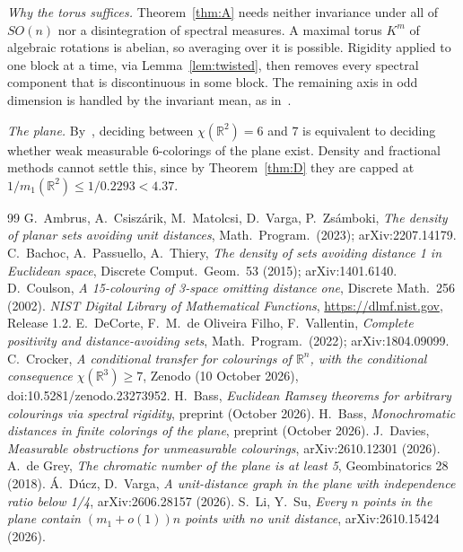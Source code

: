 \documentclass[11pt]{amsart}
\theoremstyle{definition}
\newcommand{\R}{\mathbb{R}}
\begin{document}
\emph{Why the torus suffices.} Theorem~\ref{thm:A} needs neither invariance under all of $SO(n)$ nor a disintegration of spectral measures. A maximal torus $K^m$ of algebraic rotations is abelian, so averaging over it is possible. Rigidity applied to one block at a time, via Lemma~\ref{lem:twisted}, then removes every spectral component that is discontinuous in some block. The remaining axis in odd dimension is handled by the invariant mean, as in~\cite[Lemma 2.5]{OAI}.

\emph{The plane.} By~\cite[Theorem 1.3]{OAI}, deciding between $\chi(\R^2)=6$ and $7$ is equivalent to deciding whether weak measurable $6$-colorings of the plane exist. Density and fractional methods cannot settle this, since by Theorem~\ref{thm:D} they are capped at $1/m_1(\R^2)\le 1/0.2293<4.37$.

\begin{thebibliography}{99}
 G.~Ambrus, A.~Csisz\'arik, M.~Matolcsi, D.~Varga, P.~Zs\'amboki, \emph{The density of planar sets avoiding unit distances}, Math.\ Program.\ (2023); arXiv:2207.14179.
 C.~Bachoc, A.~Passuello, A.~Thiery, \emph{The density of sets avoiding distance 1 in Euclidean space}, Discrete Comput.\ Geom.\ 53 (2015); arXiv:1401.6140.
 D.~Coulson, \emph{A 15-colouring of 3-space omitting distance one}, Discrete Math.\ 256 (2002).
 \emph{NIST Digital Library of Mathematical Functions}, \url{https://dlmf.nist.gov}, Release 1.2.
 E.~DeCorte, F.~M.~de Oliveira Filho, F.~Vallentin, \emph{Complete positivity and distance-avoiding sets}, Math.\ Program.\ (2022); arXiv:1804.09099.
 C.~Crocker, \emph{A conditional transfer for colourings of $\R^n$, with the conditional consequence $\chi(\R^3)\ge7$}, Zenodo (10 October 2026), doi:10.5281/zenodo.23273952.
 H.~Bass, \emph{Euclidean Ramsey theorems for arbitrary colourings via spectral rigidity}, preprint (October 2026).
 H.~Bass, \emph{Monochromatic distances in finite colorings of the plane}, preprint (October 2026).
 J.~Davies, \emph{Measurable obstructions for unmeasurable colourings}, arXiv:2610.12301 (2026).
 A.~de Grey, \emph{The chromatic number of the plane is at least 5}, Geombinatorics 28 (2018).
 \'A.~D\'ucz, D.~Varga, \emph{A unit-distance graph in the plane with independence ratio below 1/4}, arXiv:2606.28157 (2026).
 S.~Li, Y.~Su, \emph{Every $n$ points in the plane contain $(m_1+o(1))n$ points with no unit distance}, arXiv:2610.15424 (2026).

\end{thebibliography}
\end{document}
